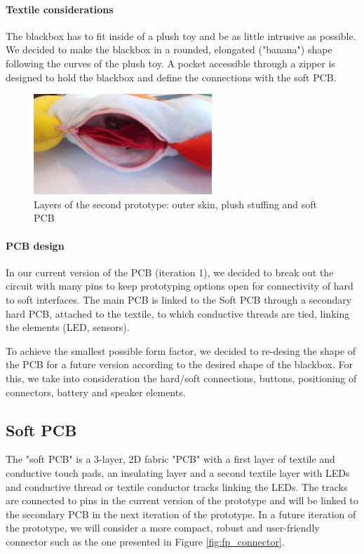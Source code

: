 \paragraph{Textile considerations}
The blackbox has to fit inside of a plush toy and be as little intrusive as possible. We decided to make the blackbox in a rounded, elongated ("banana") shape following the curves of the plush toy. A pocket accessible through a zipper is designed to hold the blackbox and define the connections with the soft PCB.

\begin{figure}[ht]
    \centering
    \includegraphics[width=0.6\textwidth]{images/HW/proto2_layers.jpg}
    \caption{Layers of the second prototype: outer skin, plush stuffing and soft PCB}
    \label{fig:p2_layers}
\end{figure}

    \paragraph{PCB design}
In our current version of the PCB (iteration 1), we decided to break out the circuit with many pins to keep prototyping options open for connectivity of hard to soft interfaces. The main PCB is linked to the Soft PCB through a secondary hard PCB, attached to the textile, to which conductive threads are tied, linking the elements (LED, sensors).
    
To achieve the smallest possible form factor, we decided to re-desing the shape of the PCB for a future version according to the desired shape of the blackbox. For this, we take into consideration the hard/soft connections, buttons, positioning of connectors, battery and speaker elements. 


\subsection{Soft PCB}\label{sec:softPCB} The "soft PCB" is a 3-layer, 2D fabric "PCB" with a first layer of textile and conductive touch pads, an insulating layer and a second textile layer with LEDs and conductive thread or textile conductor tracks linking the LEDs. The tracks are connected to pins in the current version of the prototype and will be linked to the secondary PCB in the next iteration of the prototype. In a future iteration of the prototype, we will consider a more compact, robust and user-friendly connector such as the one presented in Figure \ref{fig:fp_connector}.


